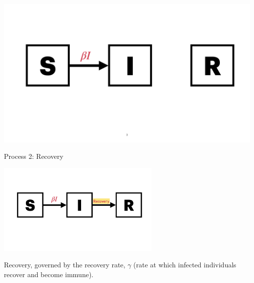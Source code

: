 \documentclass[
  ignorenonframetext,
]{beamer}
\begin{document}
\begin{frame}
\includegraphics{images/model_diagrams/model_diagrams.003.jpeg}
\end{frame}

\begin{frame}
\begin{block}{Process 2: Recovery}
\label{process-2-recovery}
\begin{center}
\includegraphics[width=0.6\textwidth,height=\textheight]{images/model_diagrams/model_diagrams.005.jpeg}
\end{center}

{Recovery}, governed by the recovery rate, \(\gamma\) (rate at which
infected individuals recover and become immune).
\end{block}
\end{frame}
\end{document}

